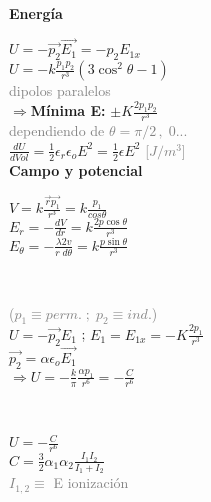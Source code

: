 \documentclass[10pt]{article}
\begin{document}
\begin{multicols}{3}
\\
\vspace{0.1cm}

\textbf{Energía}\\
\vspace{0.1cm}

$U=-\vec{p_2}\vec{E_1}=-p_2E_{1x}$\\
$U=-k\frac{p_1p_2}{r^3}(3\cos^2\theta-1)$\\
\textcolor{gray}{dipolos paralelos}\\
$\Rightarrow$\textbf{Mínima E:} $\pm K\frac{2p_1p_2}{r^3}$\\
\textcolor{gray}{dependiendo de $\theta=\pi/2\, ,\; 0...$}\\
\vspace{0.1cm}
$\frac{dU}{dVol}=\frac{1}{2}\epsilon_r\epsilon_oE^2=\frac{1}{2}\epsilon E^2$ \textcolor{gray}{[$J/m^3$]}\\

\vspace{0.1cm}
\textbf{Campo y potencial}\\
\vspace{0.1cm}

$V=k\frac{\vec{r}\vec{p_1}}{r^3}=k\frac{p_1}{cos\theta}$\\
$E_r=-\frac{dV}{dr}=k\frac{2p\cos\theta}{r^3}$\\
$E_\theta=-\frac{\lambda2v}{r\; d\theta}=k\frac{p\sin\theta}{r^3}$

\vspace{0.1cm}
\\
\vspace{0.1cm}

\textcolor{gray}{\small ($p_1\equiv perm.\; ;\; p_2\equiv ind.$)}\\
$U=-\vec{p_2}E_1$ ; $E_1=E_{1x}=-K\frac{2p_1}{r^3}$\\
$\vec{p_2}=\alpha\epsilon_o\vec{E_1}$\\
$\Rightarrow U=-\frac{k}{\pi}\frac{\alpha p_1}{r^6}=-\frac{C}{r^6}$ 

\vspace{0.1cm}
\\
\vspace{0.1cm}

$U=-\frac{C}{r^6}$\\
$C=\frac{3}{2}\alpha_1\alpha_2\frac{I_1I_2}{I_1+I_2}$\\
\textcolor{gray}{$I_{1,2}\equiv$ E ionización}


\end{multicols}
\end{document}
